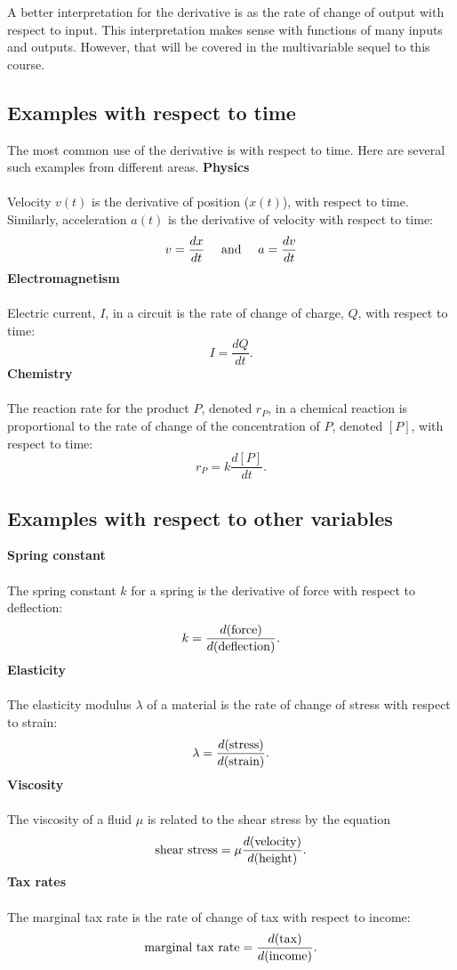 \documentclass[twoside,openright,titlepage,a4paper]{book}
\begin{document}
\begin{sloppypar}
A better interpretation for the derivative is as the rate of change of output with respect to input. This interpretation makes sense with functions of many inputs and outputs. However, that will be covered in the multivariable sequel to this course.

\subsection{Examples with respect to time}
The most common use of the derivative is with respect to time. Here are several such examples from different areas.
\bigbreak
\noindent \textbf{Physics}\\\\
Velocity $v(t)$ is the derivative of position ($x(t)$), with respect to time. Similarly, acceleration $a(t)$ is the derivative of velocity with respect to time:
\[ v = \frac{dx}{dt} \quad \hbox{ and } \quad a = \frac{dv}{dt} \]
\bigbreak
\noindent \textbf{Electromagnetism}\\\\
Electric current, $I$, in a circuit is the rate of change of charge, $Q$, with respect to time:
\[ I = \frac{dQ}{dt}. \]
\bigbreak
\noindent \textbf{Chemistry}\\\\
The reaction rate for the product $P$, denoted $r_P$, in a chemical reaction is proportional to the rate of change of the concentration of $P$, denoted $\left[P\right]$, with respect to time:
\[ r_P = k \frac{d[P]}{dt}. \]

\subsection{Examples with respect to other variables}
\bigbreak
\noindent \textbf{Spring constant}\\\\
The spring constant $k$ for a spring is the derivative of force with respect to deflection:
\[ k = \frac{d(\hbox{force})}{d(\hbox{deflection})}. \]
\bigbreak
\noindent \textbf{Elasticity}\\\\
The elasticity modulus $\lambda$ of a material is the rate of change of stress with respect to strain:
\[ \lambda = \frac{d(\hbox{stress})}{d(\hbox{strain})}. \] 
\bigbreak
\noindent \textbf{Viscosity}\\\\
The viscosity of a fluid $\mu$ is related to the shear stress by the equation
\[ \hbox{shear stress} = \mu \frac{d(\hbox{velocity})}{d(\hbox{height})}. \] 
\bigbreak
\noindent \textbf{Tax rates}\\\\
The marginal tax rate is the rate of change of tax with respect to income:
\[ \hbox{marginal tax rate} = \frac{d(\hbox{tax})}{d(\hbox{income})}. \]


\end{sloppypar}
\end{document}
